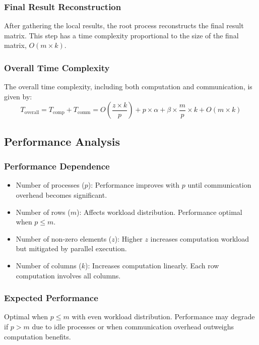 \documentclass[12pt,oneside]{book} %
\begin{document}
\subsubsection{Final Result Reconstruction}
After gathering the local results, the root process reconstructs the final
result matrix. This step has a time complexity proportional to the size of the
final matrix, \(O(m \times k)\).

\subsubsection{Overall Time Complexity}
The overall time complexity, including both computation and communication, is
given by:
\begin{equation}
    T_{\text{overall}} = T_{\text{comp}} + T_{\text{comm}} =  O\left(\frac{z \times k}{p}\right) + p \times \alpha + \beta \times \frac{m}{p} \times k + O(m \times k)
\end{equation}

\subsection{Performance Analysis}

\subsubsection{Performance Dependence}
\begin{itemize}
    \item Number of processes ($p$): Performance improves with $p$ until communication
          overhead becomes significant.
    \item Number of rows ($m$): Affects workload distribution. Performance optimal when
          $p \leq m$.
    \item Number of non-zero elements ($z$): Higher $z$ increases computation workload
          but mitigated by parallel execution.
    \item Number of columns ($k$): Increases computation linearly. Each row computation
          involves all columns.
\end{itemize}

\subsubsection{Expected Performance}
Optimal when $p \leq m$ with even workload distribution. Performance may
degrade if $p > m$ due to idle processes or when communication overhead
outweighs computation benefits.
\end{document}
